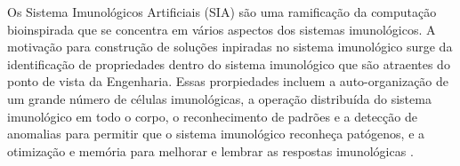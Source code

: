 Os Sistema Imunológicos Artificiais (SIA) são uma ramificação da computação bioinspirada que se concentra em vários aspectos dos sistemas imunológicos. A motivação para construção de soluções inpiradas no sistema imunológico surge da identificação de propriedades dentro do sistema imunológico que são atraentes do ponto de vista da Engenharia. Essas prorpiedades incluem a auto-organização de um grande número de células imunológicas, a operação distribuída do sistema imunológico em todo o corpo, o reconhecimento de padrões e a detecção de anomalias para permitir que o sistema imunológico reconheça patógenos, e a otimização e memória para melhorar e lembrar as respostas imunológicas \cite{nunes2001}.